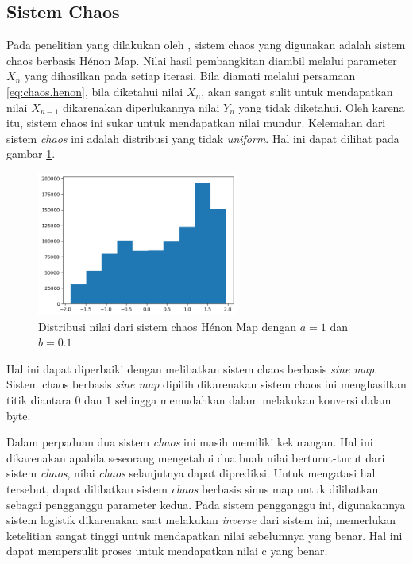 \subsection{Sistem Chaos}

Pada penelitian yang dilakukan oleh \textcite{lin2021}, sistem chaos yang digunakan adalah sistem chaos berbasis Hénon Map. Nilai hasil pembangkitan diambil melalui parameter $X_n$ yang dihasilkan pada setiap iterasi. Bila diamati melalui persamaan \ref{eq:chaos.henon}, bila diketahui nilai $X_n$, akan sangat sulit untuk mendapatkan nilai $X_{n-1}$ dikarenakan diperlukannya nilai $Y_n$ yang tidak diketahui. Oleh karena itu, sistem chaos ini sukar untuk mendapatkan nilai mundur. Kelemahan dari sistem \emph{chaos} ini adalah distribusi yang tidak \emph{uniform}. Hal ini dapat dilihat pada gambar \ref{fig:chaos.henon.distribution}.

\begin{figure}[!h]
  \centering
  \includegraphics[width=250px]{chapters/res/chapter-3/img/henon.distribution.png}
  \caption{Distribusi nilai dari sistem chaos Hénon Map dengan $a=1$ dan $b=0.1$} \label{fig:chaos.henon.distribution}
\end{figure}

Hal ini dapat diperbaiki dengan melibatkan sistem chaos berbasis \emph{sine map}. Sistem chaos berbasis \emph{sine map} dipilih dikarenakan sistem chaos ini menghasilkan titik diantara $0$ dan $1$ sehingga memudahkan dalam melakukan konversi dalam byte.

Dalam perpaduan dua sistem \emph{chaos} ini masih memiliki kekurangan. Hal ini dikarenakan apabila seseorang mengetahui dua buah nilai berturut-turut dari sistem \emph{chaos}, nilai \emph{chaos} selanjutnya dapat diprediksi. Untuk mengatasi hal tersebut, dapat dilibatkan sistem \emph{chaos} berbasis sinus map untuk dilibatkan sebagai pengganggu parameter kedua. Pada sistem pengganggu ini, digunakannya sistem logistik dikarenakan saat melakukan \emph{inverse} dari sistem ini, memerlukan ketelitian sangat tinggi untuk mendapatkan nilai sebelumnya yang benar. Hal ini dapat mempersulit proses untuk mendapatkan nilai c yang benar. %

